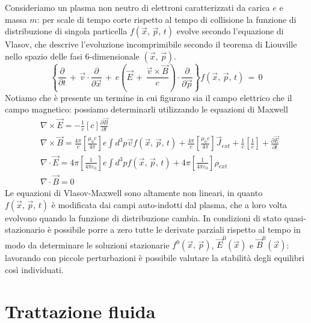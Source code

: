 Consideriamo un plasma non neutro di elettroni caratterizzati da carica $e$ e massa $m$: per scale di tempo corte rispetto
al tempo di collisione la funzione di distribuzione di singola particella $f\left(\vec{x},\,\vec{p},\,t\right)$ evolve secondo
l'equazione di Vlasov, che descrive l'evoluzione incomprimibile secondo il teorema di Liouville nello spazio delle fasi
6-dimensionale $\left(\vec{x},\,\vec{p}\right)$.
\begin{equation}
    \left\{\frac{\partial}{\partial t}\,+\,\vec{v}\cdot\frac{\partial}{\partial \vec{x}}\,+\,e\left(\vec{E}\,+\,\frac{\vec{v}\times\vec{B}}{c}\right)\cdot\frac{\partial}{\partial \vec{p}}\right\}f\left(\vec{x},\,\vec{p},\,t\right)\,=\,0
    \label{equation: VlasovEq}
\end{equation}
Notiamo che è presente un termine in cui figurano sia il campo elettrico che il campo magnetico: possiamo determinarli utilizzando le
equazioni di Maxwell
\begin{align}
    &\nabla \times \vec{E} = -\frac{1}{c}\left[c\right]\frac{\partial \vec{B}}{\partial t} \\
    &\nabla \times \vec{B} = \frac{4\pi}{c}\left[\frac{\mu_0 c}{4\pi}\right]e\int{d^3p\vec{v}f(\vec{x},\,\vec{p},\,t)} + \frac{4\pi}{c}\left[\frac{\mu_0 c}{4\pi}\right]\vec{J}_{ext} + \frac{1}{c}\left[\frac{1}{c}\right] + \frac{\partial \vec{E}}{\partial t} \\
    &\nabla \cdot \vec{E} = 4\pi\left[\frac{1}{4\pi\varepsilon_0}\right]e\int{d^3p f\left(\vec{x},\,\vec{p},\,t\right)} + 4\pi\left[\frac{1}{4\pi\varepsilon_0}\right]\rho_{ext} \\
    &\nabla \cdot \vec{B} = 0
\end{align}
Le equazioni di Vlasov-Maxwell sono altamente non lineari, in quanto $f\left(\vec{x},\,\vec{p},\,t\right)$ è modificata dai campi auto-indotti
dal plasma, che a loro volta evolvono quando la funzione di distribuzione cambia. In condizioni di stato quasi-stazionario è possibile
porre a zero tutte le derivate parziali rispetto al tempo in modo da determinare le soluzioni stazionarie $f^0\left(\vec{x},\,\vec{p}\right)$,
$\vec{E}^0\left(\vec{x}\right)$ e $\vec{B}^0\left(\vec{x}\right)$: lavorando con piccole perturbazioni è possibile valutare la stabilità
degli equilibri così individuati.

\section{Trattazione fluida}

